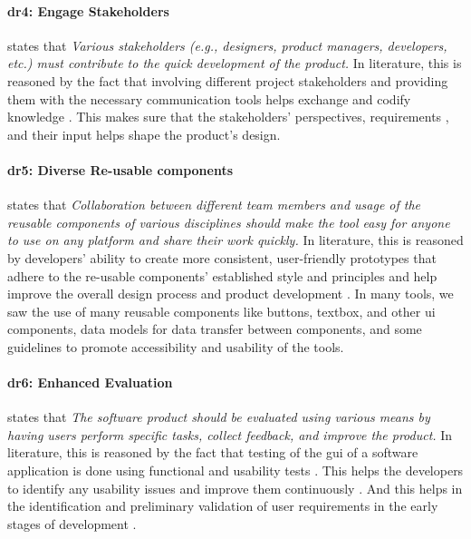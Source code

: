 \paragraph{\ac{dr}4: Engage Stakeholders} states that \textit{Various stakeholders (e.g., designers, product managers, developers, etc.) must contribute to the quick development of the product.}
In literature, this is reasoned by the fact that involving different project stakeholders and providing them with the necessary communication tools helps exchange and codify knowledge \cite{article:prototyping:weichbroth}. 
This makes sure that the stakeholders' perspectives, requirements \cite{misc:prorotypes:lauff}, and their input helps shape the product's design.

\paragraph{\ac{dr}5: Diverse Re-usable components} states that \textit{Collaboration between different team members and usage of the reusable components of various disciplines should make the tool easy for anyone to use on any platform and share their work quickly.} 
In literature, this is reasoned by developers' ability to create more consistent, user-friendly prototypes that adhere to the re-usable components' established style and principles \cite{paper:prototyping:luqi} and help improve the overall design process and product development \cite{article:prototyping:hoffnagle}.
In many tools, we saw the use of many reusable components like buttons, textbox, and other \ac{ui} components, data models for data transfer between components, and some guidelines to promote accessibility and usability of the tools.

\paragraph{\ac{dr}6: Enhanced Evaluation} states that \textit{The software product should be evaluated using various means by having users perform specific tasks, collect feedback, and improve the product.} 
In literature, this is reasoned by the fact that testing of the \ac{gui} of a software application is done using functional and usability tests \cite{misc:usability:tasks}. 
This helps the developers to identify any usability issues \cite{article:tbup:kari} and improve them continuously \cite{article:prototyping:gould}.
And this helps in the identification and preliminary validation of user requirements in the early stages of development \cite{article:prototyping:weichbroth}. 

